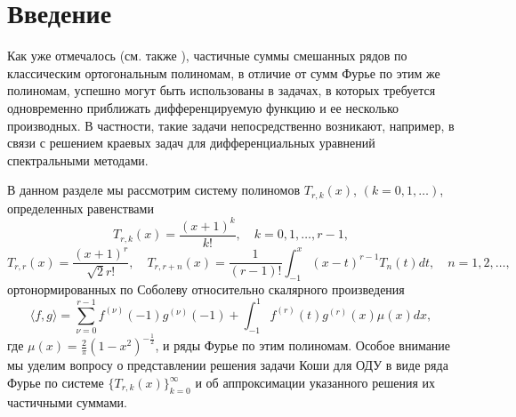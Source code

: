 \section{Введение}

Как уже отмечалось (см. также \cite{Shar11, Shar12, Shar13, Shar14, Shar2006, Shar2008, Shar2003, Shar18}), частичные суммы смешанных рядов по классическим ортогональным полиномам, в отличие от сумм Фурье по этим же полиномам, успешно могут быть использованы в задачах, в которых требуется одновременно приближать дифференцируемую функцию и ее несколько производных. В частности, такие задачи непосредственно возникают, например, в связи с решением краевых задач для дифференциальных уравнений спектральными методами.

В данном разделе мы рассмотрим систему полиномов $T_{r,k}(x)$,  $(k=0,1,\ldots)$, определенных равенствами
\begin{equation}\label{du2018cheb-1.4}
T_{r,k}(x) =\frac{(x+1)^k}{k!}, \quad k=0,1,\ldots, r-1,
\end{equation}
\begin{equation}\label{du2018cheb-1.5}
T_{r,r}(x) =\frac{(x+1)^r}{\sqrt{2}r!},\quad T_{r,r+n}(x) =\frac{1}{(r-1)!}\int_{-1}^x(x-t)^{r-1}T_{n}(t)dt, \quad n=1,2,\ldots,
\end{equation}
ортонормированных по Соболеву относительно скалярного произведения
\begin{equation}\label{du2018cheb-1.3}
\langle f,g\rangle=\sum_{\nu=0}^{r-1}f^{(\nu)}(-1)g^{(\nu)}(-1)+\int_{-1}^{1}f^{(r)}(t)g^{(r)}(x)\mu(x)dx,
\end{equation}
где $\mu(x)=\frac2\pi(1-x^2)^{-\frac12}$, и ряды Фурье по этим полиномам. Особое внимание мы уделим вопросу о представлении  решения задачи Коши для ОДУ  в виде ряда Фурье по системе $\{T_{r,k}(x)\}_{k=0}^\infty$  и об аппроксимации указанного решения их частичными суммами.

